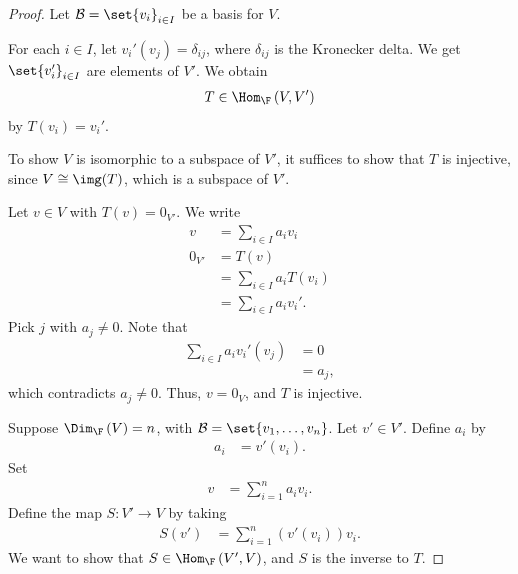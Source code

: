 \documentclass[10pt]{mypackage}
\begin{document}
\begin{proof}
  Let $\mathcal{B} = \set{v_i}_{i\in I}$ be a basis for $V$.\newline

  For each $i\in I$, let $v_i'(v_j) = \delta_{ij}$, where $\delta_{ij}$ is the Kronecker delta. We get $\set{v_i'}_{i\in I}$ are elements of $V'$. We obtain
  \begin{align*}
    T\in \Hom_{\F}\left(V,V'\right)
  \end{align*}
  by $T\left(v_i\right) = v_i'$.\newline

  To show $V$ is isomorphic to a subspace of $V'$, it suffices to show that $T$ is injective, since $V\cong \img(T)$, which is a subspace of $V'$.\newline

  Let $v\in V$ with $T(v) = 0_{V'}$. We write
  \begin{align*}
    v &= \sum_{i\in I}a_iv_i\\
    0_{V'}&= T(v)\\
                    &= \sum_{i\in I}a_iT\left(v_i\right)\\
                    &= \sum_{i\in I}a_iv_i'.
  \end{align*}
  Pick $j$ with $a_j\neq 0$. Note that
  \begin{align*}
    \sum_{i\in I}a_iv_i'(v_j) &= 0\\
                              &= a_j,
  \end{align*}
  which contradicts $a_j\neq 0$. Thus, $v = 0_V$, and $T$ is injective.\newline

  Suppose $\Dim_{\F}\left(V\right) = n$, with $\mathcal{B} = \set{v_1,\dots,v_n}$. Let $v'\in V'$. Define $a_i$ by
  \begin{align*}
    a_i &= v'\left(v_i\right).
  \end{align*}
  Set
  \begin{align*}
    v &= \sum_{i=1}^{n}a_iv_i.
  \end{align*}
  Define the map $S: V'\rightarrow V$ by taking
  \begin{align*}
    S\left(v'\right) &= \sum_{i=1}^{n}\left(v'\left(v_i\right)\right)v_i.
  \end{align*}
  We want to show that $S\in \Hom_{\F}\left(V',V\right)$, and $S$ is the inverse to $T$.\newline


\end{proof}
\end{document}
